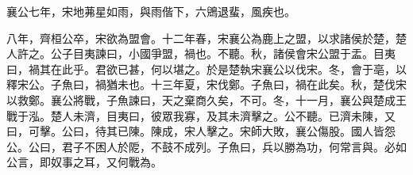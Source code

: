 襄公七年，宋地茀星如雨，與雨偕下，六鶂退蜚，風疾也。

八年，齊桓公卒，宋欲為盟會。十二年春，宋襄公為鹿上之盟，以求諸侯於楚，楚人許之。公子目夷諫曰，小國爭盟，禍也。不聽。秋，諸侯會宋公盟于盂。目夷曰，禍其在此乎。君欲已甚，何以堪之。於是楚執宋襄公以伐宋。冬，會于亳，以釋宋公。子魚曰，禍猶未也。十三年夏，宋伐鄭。子魚曰，禍在此矣。秋，楚伐宋以救鄭。襄公將戰，子魚諫曰，天之棄商久矣，不可。冬，十一月，襄公與楚成王戰于泓。楚人未濟，目夷曰，彼眾我寡，及其未濟擊之。公不聽。已濟未陳，又曰，可擊。公曰，待其已陳。陳成，宋人擊之。宋師大敗，襄公傷股。國人皆怨公。公曰，君子不困人於阸，不鼓不成列。子魚曰，兵以勝為功，何常言與。必如公言，即奴事之耳，又何戰為。